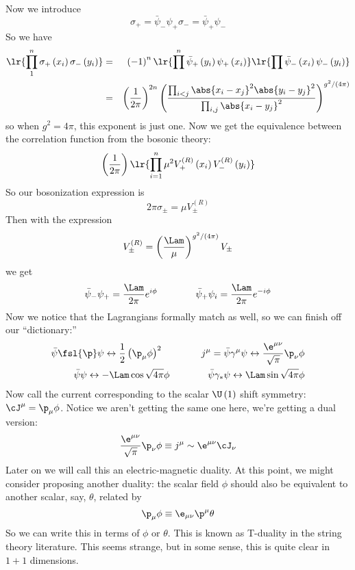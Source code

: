 \documentclass{booc}
\begin{document}
Now we introduce
\begin{equation}
\sigma_+ = \bar \psi_- \psi_+
\sigma_- = \bar \psi_+ \psi_-
\end{equation}
So we have
\begin{eqnarray}
\lr{
\prod_{1}^n \sigma_+\left( x_i \right)\sigma_-\left( y_i \right)
}
&=& \left( -1 \right)^n \lr{\prod^n \bar \psi_+\left( y_i \right) \psi_+\left( x_i \right)}
\lr{\prod \bar \psi_- \left( x_i \right) \psi_-\left( y_i \right)} 
\\
&=& 
\left( \frac{1}{2\pi} \right)^{2n}
\left( 
\frac{
\prod_{i<j} \abs{x_i - x_j}^2
\abs{y_i - y_j}^2
}{
\prod_{i,j} \abs{x_i - y_j}^2
}
\right)
^{g^2 / \left( 4\pi \right)}
\end{eqnarray}
so when $g^2 = 4\pi$, this exponent is just one.
Now we get the equivalence between the correlation function from the bosonic theory:
\begin{equation}
\left( \frac{1}{2\pi} \right)
\lr{
\prod_{i = 1}^n
\mu^2 V_+^{\left( R \right)}\left( x_i \right)
V_-^{\left( R \right)}\left( y_i \right)
}
\end{equation}
So our bosonization expression is
\begin{equation}
2\pi \sigma_{\pm} = 
\mu V_{\pm}^{\left( R \right)}
\end{equation}
Then with the expression
\begin{equation}
V_{\pm}^{\left( R \right)} = 
\left( \frac{\Lam}{\mu} \right)^{g^2 / \left( 4\pi \right)}
V_{\pm}
\end{equation}
we get
\begin{equation}
\bar \psi_-\psi_+ = 
\frac{\Lam}{2\pi}e^{i\phi}
\qquad\qquad
\bar\psi_+ \psi_i = 
\frac{\Lam}{2\pi} e^{-i\phi}
\end{equation}
Now we notice that the Lagrangians formally match as well,
so we can finish off our ``dictionary:''
\begin{eqnarray}
\bar \psi \fsl{\p} \psi 
\leftrightarrow 
\frac{1}{2}\left( \p_\mu \phi \right)^2
\qquad\qquad
j^\mu = \bar \psi \gamma^\mu \psi 
\leftrightarrow 
\frac{\e^{\mu\nu}}{\sqrt{\pi}} \p_\nu \phi
\\
\bar\psi \psi 
\leftrightarrow
-\Lam \cos \sqrt{4\pi} \phi
\qquad\qquad
\bar \psi \gamma_* \psi
\leftrightarrow
\Lam \sin\sqrt{4\pi} \phi
\end{eqnarray}
Now call the current corresponding to the scalar $\U\left( 1 \right)$ shift symmetry:
$\cJ^\mu = \p_\mu \phi$. 
Notice we aren't getting the same one here, we're getting a dual version:
\begin{equation}
\frac{\e^{\mu\nu}}{\sqrt{\pi}} \p_\nu \phi
\equiv j^\mu\sim \e^{\mu\nu} \cJ_\nu
\end{equation}
Later on we will call this an electric-magnetic duality.
At this point, we might consider proposing another duality:
the scalar field $\phi$ should also be equivalent to another scalar, say, $\theta$, 
related by
\begin{equation}
\p_\mu \phi \equiv \e_{\mu\nu}\p^\mu \theta
\end{equation}
So we can write this in terms of $\phi$ or $\theta$. 
This is known as T-duality in the string theory literature.
This seems strange, but in some sense, this is quite clear in $1+1$ dimensions. 
\end{document}
